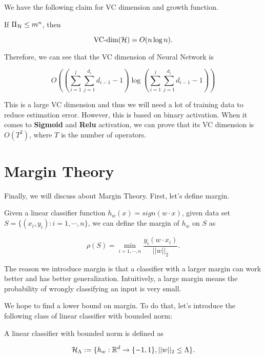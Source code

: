 \documentclass[../main.tex]{subfiles}
\begin{document}
	
	We have the following claim for VC dimension and growth function.
	
	\begin{claim}
		If $\Pi_{\mathcal{H}} \leq m^n$, then
		
		\begin{equation}
			\textmd{VC-dim}(\mathcal{H}) = O(n\log n).
		\end{equation}
	\end{claim}

	Therefore, we can see that the VC dimension of Neural Network is 
	
	\begin{equation*}
		O((\sum\limits_{i=1}^l \sum\limits_{j=1}^{d_i}d_{i-1} - 1)\log (\sum\limits_{i=1}^l \sum\limits_{j=1}^{d_i}d_{i-1} - 1))
	\end{equation*}

	This is a large VC dimension and thus we will need a lot of training data to reduce estimation error. However, this is based on binary activation. When it comes to \textbf{Sigmoid} and \textbf{Relu} activation, we can prove that its VC dimension is $O(T^2)$, where $T$ is the number of operators.
	
	\section{Margin Theory}
	
	Finally, we  will discuss about Margin Theory. First, let's define margin.
	
	\begin{definition}
		Given a linear classifier function $h_{w}(x) = sign(w \cdot x)$, given data set $S = \{(x_i,y_i):i=1,\cdots, n \}$, we can define the margin of $h_w$ on $S$ as
		
		\begin{equation}
			\rho(S) = \min\limits_{i=1,\cdots,n} \frac{y_i(w\cdot x_i)}{||w||_2}.
		\end{equation}
	\end{definition}
	
	The reason we introduce margin is that a classifier with a larger margin can work better and has better generalization. Intuitively, a large margin means the probability of wrongly classifying an input is very small.
	
	We hope to find a lower bound on margin. To do that, let's introduce the following class of linear classifier with bounded norm:
	
	\begin{definition}
		A linear classifier with bounded norm is defined as 
		
		\begin{equation}
			\mathcal{H}_{\Lambda} := \{h_w:\mathbb{R}^d \to \{-1,1\}, ||w||_2 \leq \Lambda \}.
		\end{equation}
	\end{definition}
\end{document}
